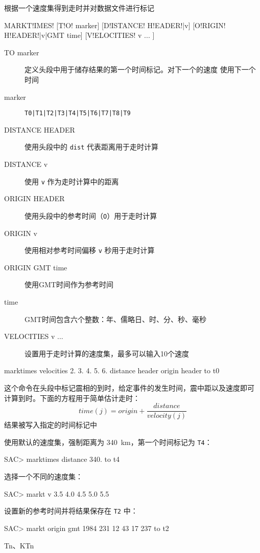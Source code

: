 \label{cmd:marktimes}

根据一个速度集得到走时并对数据文件进行标记

\begin{SACSTX}
MARKT!IMES! [T!O! marker] [D!ISTANCE! H!EADER!|v] [O!RIGIN! H!EADER!|v|GMT time]
    [V!ELOCITIES! v ... ]
\end{SACSTX}

\begin{description}
\item [TO marker] 定义头段中用于储存结果的第一个时间标记。对下一个的速度
    使用下一个时间
\item [marker] \texttt{T0|T1|T2|T3|T4|T5|T6|T7|T8|T9}
\item [DISTANCE HEADER] 使用头段中的 \texttt{dist} 代表距离用于走时计算
\item [DISTANCE v] 使用 \texttt{v} 作为走时计算中的距离
\item [ORIGIN HEADER] 使用头段中的参考时间（\texttt{O}）用于走时计算
\item [ORIGIN v] 使用相对参考时间偏移 \texttt{v} 秒用于走时计算
\item [ORIGIN GMT time] 使用GMT时间作为参考时间
\item [time] GMT时间包含六个整数：年、儒略日、时、分、秒、毫秒
\item [VELOCITIES v ...] 设置用于走时计算的速度集，最多可以输入10个速度
\end{description}

\begin{SACDFT}
marktimes velocities 2. 3. 4. 5. 6. distance
    header origin header to t0
\end{SACDFT}

这个命令在头段中标记震相的到时，给定事件的发生时间，震中距以及速度即可
计算到时。下面的方程用于简单估计走时：
 		\[ time(j) = origin + \frac{distance}{velocity(j)} \]
结果被写入指定的时间标记中

使用默认的速度集，强制距离为 \SI{340}{\km}，第一个时间标记为 \texttt{T4}：
\begin{SACCode}
SAC> marktimes distance 340. to t4
\end{SACCode}

选择一个不同的速度集：
\begin{SACCode}
SAC> markt v 3.5 4.0 4.5 5.0 5.5
\end{SACCode}

设置新的参考时间并将结果保存在 \texttt{T2} 中：
\begin{SACCode}
SAC> markt origin gmt 1984 231 12 43 17 237 to t2
\end{SACCode}

Tn、KTn
